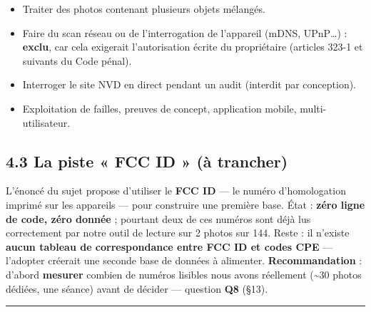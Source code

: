 \documentclass[11pt,a4paper]{article}
\begin{document}
\begin{itemize}  \item Traiter des photos contenant plusieurs objets mélangés.
\end{itemize}

\begin{itemize}  \item Faire du scan réseau ou de l'interrogation de l'appareil (mDNS, UPnP…) : \textbf{exclu}, car cela exigerait l'autorisation écrite du propriétaire (articles 323-1 et suivants du Code pénal).
\end{itemize}

\begin{itemize}  \item Interroger le site NVD en direct pendant un audit (interdit par conception).
\end{itemize}

\begin{itemize}  \item Exploitation de failles, preuves de concept, application mobile, multi-utilisateur.
\end{itemize}

\subsection*{4.3 La piste « FCC ID » (à trancher)}
L'énoncé du sujet propose d'utiliser le \textbf{FCC ID} — le numéro d'homologation imprimé sur les appareils — pour construire une première base. État : \textbf{zéro ligne de code, zéro donnée} ; pourtant deux de ces numéros sont déjà lus correctement par notre outil de lecture sur 2 photos sur 144. Reste : il n'existe \textbf{aucun tableau de correspondance entre FCC ID et codes CPE} — l'adopter créerait une seconde base de données à alimenter. \textbf{Recommandation} : d'abord \textbf{mesurer} combien de numéros lisibles nous avons réellement (\textasciitilde{}30 photos dédiées, une séance) avant de décider — question \textbf{Q8} (§13).

\medskip\hrule\medskip
\end{document}
